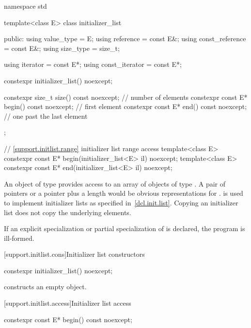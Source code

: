 \begin{codeblock}
namespace std {
  template<class E> class initializer_list {
  public:
    using value_type      = E;
    using reference       = const E&;
    using const_reference = const E&;
    using size_type       = size_t;

    using iterator        = const E*;
    using const_iterator  = const E*;

    constexpr initializer_list() noexcept;

    constexpr size_t size() const noexcept;      // number of elements
    constexpr const E* begin() const noexcept;   // first element
    constexpr const E* end() const noexcept;     // one past the last element
  };

  // \ref{support.initlist.range} initializer list range access
  template<class E> constexpr const E* begin(initializer_list<E> il) noexcept;
  template<class E> constexpr const E* end(initializer_list<E> il) noexcept;
}
\end{codeblock}

\pnum
An object of type  provides access to an array of
objects of type . \enternote A pair of pointers or a pointer plus
a length would be obvious representations for .
 is used to implement initializer lists as specified
in~\ref{dcl.init.list}. Copying an initializer list does not copy the underlying
elements. \exitnote

\pnum
If an explicit specialization or partial specialization of
 is declared, the program is ill-formed.

[support.initlist.cons]{Initializer list constructors}

\begin{itemdecl}
constexpr initializer_list() noexcept;
\end{itemdecl}

\begin{itemdescr}
\pnum
\effects constructs an empty  object.

\pnum
\postcondition {}
\end{itemdescr}

[support.initlist.access]{Initializer list access}

\begin{itemdecl}
constexpr const E* begin() const noexcept;
\end{itemdecl}


